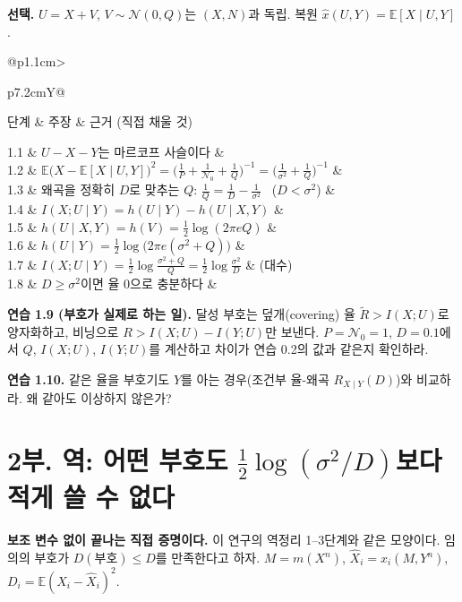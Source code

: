 \documentclass[11pt,a4paper]{article}
\makeatletter
\newcommand{\steptable}[1]{%
  \renewcommand{\arraystretch}{1.55}%
  \begin{tabularx}{\linewidth}{@{}p{1.1cm}>{\raggedright\arraybackslash}p{7.2cm}Y@{}}
  \toprule
  단계 & 주장 & 근거 (직접 채울 것)\\ \midrule
  #1
  \bottomrule
  \end{tabularx}}
\newcommand{\E}{\mathbb{E}}
\makeatother
\begin{document}
\textbf{선택.} $U=X+V$, $V\sim\mathcal N(0,Q)$는 $(X,N)$과 독립. 복원 $\hat x(U,Y)=\E[X\mid U,Y]$.

\steptable{
1.1 & $U-X-Y$는 마르코프 사슬이다 & \\
1.2 & $\E\big(X-\E[X\mid U,Y]\big)^2=\big(\tfrac1P+\tfrac1{\mathcal N_0}+\tfrac1Q\big)^{-1}=\big(\tfrac1{\sigma^2}+\tfrac1Q\big)^{-1}$ & \\
1.3 & 왜곡을 정확히 $D$로 맞추는 $Q$: $\tfrac1Q=\tfrac1D-\tfrac1{\sigma^2}$ \ ($D<\sigma^2$) & \\
1.4 & $I(X;U\mid Y)=h(U\mid Y)-h(U\mid X,Y)$ & \\
1.5 & $h(U\mid X,Y)=h(V)=\tfrac12\log(2\pi e Q)$ & \\
1.6 & $h(U\mid Y)=\tfrac12\log\big(2\pi e(\sigma^2+Q)\big)$ & \\
1.7 & $I(X;U\mid Y)=\tfrac12\log\tfrac{\sigma^2+Q}{Q}=\tfrac12\log\tfrac{\sigma^2}{D}$ & (대수)\\
1.8 & $D\ge\sigma^2$이면 율 $0$으로 충분하다 & \\
}

\textbf{연습 1.9 (부호가 실제로 하는 일).} 달성 부호는 덮개(covering) 율 $\tilde R>I(X;U)$로 양자화하고, 비닝으로 $R>I(X;U)-I(Y;U)$만 보낸다. $P=\mathcal N_0=1$, $D=0.1$에서 $Q$, $I(X;U)$, $I(Y;U)$를 계산하고 차이가 연습 0.2의 값과 같은지 확인하라.

\vspace{4.5em}

\textbf{연습 1.10.} 같은 율을 부호기도 $Y$를 아는 경우(조건부 율-왜곡 $R_{X\mid Y}(D)$)와 비교하라. 왜 같아도 이상하지 않은가?

\vspace{3.5em}

\section*{2부. 역: 어떤 부호도 $\tfrac12\log(\sigma^2/D)$보다 적게 쓸 수 없다}

\textbf{보조 변수 없이 끝나는 직접 증명이다.} 이 연구의 역정리 1–3단계와 같은 모양이다. 임의의 부호가 $D(\text{부호})\le D$를 만족한다고 하자. $M=m(X^n)$, $\hat X_i=\hat x_i(M,Y^n)$, $D_i=\E(X_i-\hat X_i)^2$.
\end{document}
